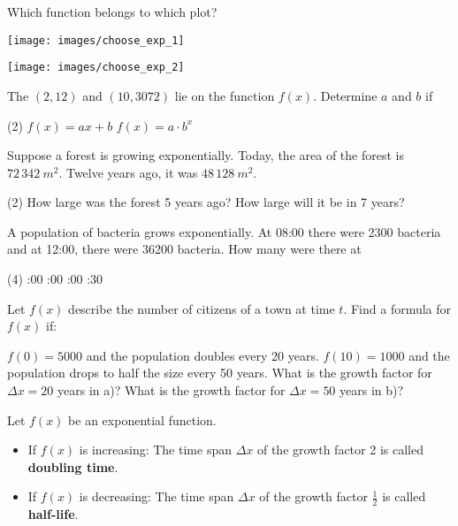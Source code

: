 \begin{exercise}
	Which function belongs to which plot?\\[10pt]
	\begin{minipage}{0.48\textwidth}
		\centering
		\texttt{[image: images/choose\_exp\_1]}
	\end{minipage}
	\begin{minipage}{0.48\textwidth}
		\centering
		\texttt{[image: images/choose\_exp\_2]}
	\end{minipage}
\end{exercise}
\begin{exercise}
	The $\left(2,12\right)$ and $\left(10,3072\right)$ lie on the function $f\left(x\right)$.
	Determine $a$ and $b$ if
	\begin{tasks}(2)
		\task $f\left(x\right)=ax+b$
		\task $f\left(x\right)=a\cdot b^x$
	\end{tasks}
\end{exercise}
\pagebreak
\begin{exercise}
	Suppose a forest is growing exponentially.
	Today, the area of the forest is $72\,342\ m^2$.
	Twelve years ago, it was $48\,128\ m^2$.
	\begin{tasks}(2)
		\task How large was the forest 5 years ago?
		\task How large will it be in 7 years?
	\end{tasks}
\end{exercise}
\begin{exercise}
	A population of bacteria grows exponentially.
	At 08:00 there were 2300 bacteria and at 12:00, there were 36200 bacteria.
	How many were there at
	\begin{tasks}(4)
		:00
		:00
		:00
		:30
	\end{tasks}
\end{exercise}
\begin{exercise}
	Let $f\left(x\right)$ describe the number of citizens of a town at time $t$.
	Find a formula for $f\left(x\right)$ if:
	\begin{tasks}
		\task $f\left(0\right)=5000$ and the population doubles every 20 years.
		\task $f\left(10\right)=1000$ and the population drops to half the size every 50 years.
		\task What is the growth factor for $\Delta x=20$ years in a)?
		\task What is the growth factor for $\Delta x=50$ years in b)?
	\end{tasks}
\end{exercise}
\begin{definition*}
	Let $f\left(x\right)$ be an exponential function.
	\begin{itemize}
		\item If $f\left(x\right)$ is increasing: The time span $\Delta x$ of the growth factor 2 is called \textbf{doubling time}.
		\item If $f\left(x\right)$ is decreasing: The time span $\Delta x$ of the growth factor $\frac{1}{2}$ is called \textbf{half-life}.
	\end{itemize}
\end{definition*}
